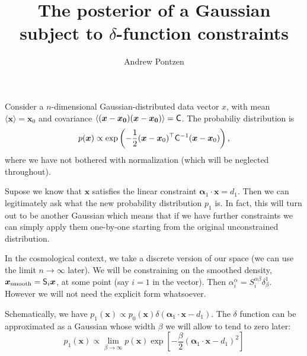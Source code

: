 \documentclass[11pt,a4paper,preprint]{aastex}
\title{The posterior of a Gaussian subject to $\delta$-function constraints}
\author{Andrew Pontzen}
\newcommand{\bmath}[1]{\ensuremath{\bm{#1}}}
\renewcommand{\vec}[1]{\bmath{#1}}
\newcommand{\tens}[1]{{\bf \sf #1}}
\begin{document}
\maketitle

Consider a $n$-dimensional Gaussian-distributed data vector $x$, with
mean $\langle \vec{x} \rangle = \vec{x}_0$ and covariance $\langle
(\vec{x}-\vec{x_0})(\vec{x}-\vec{x_0})\rangle = \tens{C}$. The
probabiliy distribution is
\begin{equation}
p(\vec{x}) \propto \exp \left(-\frac{1}{2} (\vec{x} -
  \vec{x}_0)^{\top} \tens{C}^{-1} (\vec{x}-\vec{x}_0) \right)\textrm{,}
\end{equation}
where we have not bothered with normalization (which will be neglected
throughout).

Supose we know that $\vec{x}$ satisfies the linear constraint
$\vec{\alpha}_1 \cdot \vec{x} = d_1$. Then we can legitimately ask
what the new probability distribution $p_1$ is. In fact, this will
turn out to be another Gaussian which means that if we have further
constraints we can simply apply them one-by-one starting from the
original unconstrained distribution.

In the cosmological context, we take a discrete version of our space
(we can use the limit $n \to \infty$ later). We will be constraining
on the smoothed density, $\vec{x}_{\mathrm{smooth}} = \tens{S}_i
\vec{x}$, at some point (say $i=1$ in the vector). Then
$\alpha_i^{\alpha} = S_i^{\alpha \beta} \delta_{\beta}^{1}$. However we
will not need the explicit form whatsoever.

Schematically, we have $p_1(\vec{x}) \propto p_0(\vec{x})
\delta(\vec{\alpha}_1 \cdot \vec{x} - d_1)$. The $\delta$ function
can be approximated as a Gaussian whose width $\beta$ we will allow to
tend to zero later:
\begin{equation}
p_1(\vec{x}) \propto \lim_{\beta \to \infty} p(\vec{x}) \exp \left[
  -\frac{\beta}{2} \left( \vec{\alpha}_1 \cdot \vec{x} - d_1 \right)^2 \right]
\end{equation}
\end{document}
